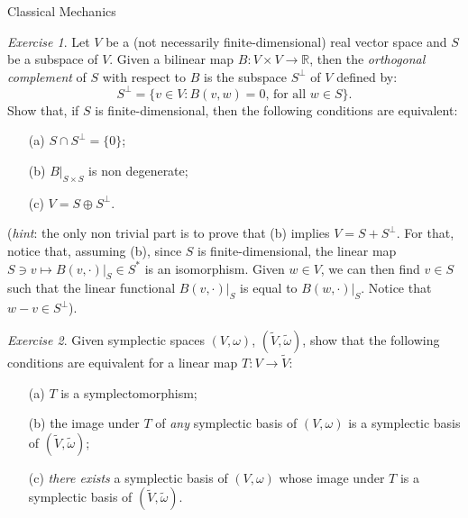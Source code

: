 \documentclass[oneside,a4paper,11pt]{amsbook}
\newcommand{\R}{\mathds R}
\theoremstyle{remark}\newtheorem{exercise}{Exercise}[chapter]
\theoremstyle{plain}\newtheorem{teo}{Theorem}[section]
\theoremstyle{plain}\newtheorem{lem}[teo]{Lemma}
\theoremstyle{plain}\newtheorem{prop}[teo]{Proposition}
\theoremstyle{plain}\newtheorem{cor}[teo]{Corollary}
\theoremstyle{definition}\newtheorem{defin}[teo]{Definition}
\theoremstyle{remark}\newtheorem{rem}[teo]{Remark}
\theoremstyle{definition}\newtheorem{notation}[teo]{Notation}
\theoremstyle{definition}\newtheorem{convention}[teo]{Convention}
\theoremstyle{definition}\newtheorem{example}[teo]{Example}
\numberwithin{section}{chapter}
\numberwithin{equation}{section}
\begin{document}
\begin{chapter}{Classical Mechanics}
\begin{exercise}\label{exe:perpspan}
Let $V$ be a (not necessarily finite-dimensional) real vector space and $S$ be a subspace of $V$.
Given a bilinear map $B:V\times V\to\R$, then the {\em orthogonal complement\/} of $S$ with respect to $B$ is the
subspace $S^\perp$ of $V$ defined by:
\[S^\perp=\big\{v\in V:\text{$B(v,w)=0$, for all $w\in S$}\big\}.\]
Show that, if $S$ is finite-dimensional, then the following conditions are equivalent:
\begin{itemize}
\item[(a)] $S\cap S^\perp=\{0\}$;
\item[(b)] $B\vert_{S\times S}$ is non degenerate;
\item[(c)] $V=S\oplus S^\perp$.
\end{itemize}
({\em hint}: the only non trivial part is to prove that (b) implies $V=S+S^\perp$. For that, notice that, assuming (b),
since $S$ is finite-dimensional, the linear map $S\ni v\mapsto B(v,\cdot)\vert_S\in S^*$ is an isomorphism.
Given $w\in V$, we can then find $v\in S$ such that the linear functional $B(v,\cdot)\vert_S$ is equal to
$B(w,\cdot)\vert_S$. Notice that $w-v\in S^\perp$).
\end{exercise}

\begin{exercise}\label{exe:equivsymplecto}
Given symplectic spaces $(V,\omega)$, $(\widetilde V,\tilde\omega)$, show that the following conditions are equivalent
for a linear map $T:V\to\widetilde V$:
\begin{itemize}
\item[(a)] $T$ is a symplectomorphism;
\item[(b)] the image under $T$ of {\em any\/} symplectic basis of $(V,\omega)$ is a symplectic basis of $(\widetilde V,\tilde\omega)$;
\item[(c)] {\em there exists\/} a symplectic basis of $(V,\omega)$ whose image under $T$ is a symplectic basis of $(\widetilde V,\tilde\omega)$.
\end{itemize}
\end{exercise}


\end{chapter}
\end{document}
